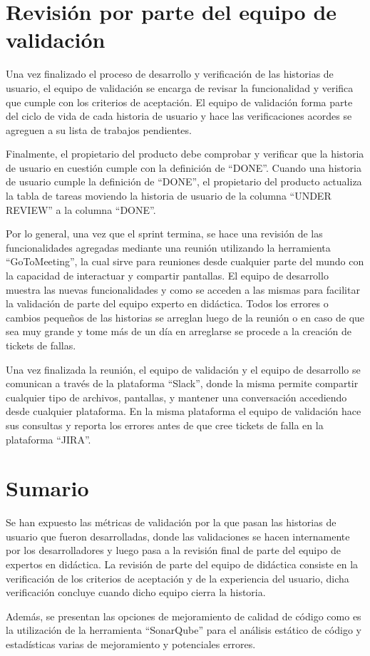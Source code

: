 \section{Revisión por parte del equipo de validación}
Una vez finalizado el proceso de desarrollo y verificación de las historias de usuario, el equipo de validación se encarga de revisar la funcionalidad y verifica que cumple con los criterios de aceptación. El equipo de validación forma parte del ciclo de vida de cada historia de usuario y hace las verificaciones acordes se agreguen a su lista de trabajos pendientes.

Finalmente, el propietario del producto debe comprobar y verificar que la historia de usuario en cuestión cumple con la definición de \enquote{DONE}. Cuando una historia de usuario cumple la definición de \enquote{DONE}, el propietario del producto actualiza la tabla de tareas moviendo la historia de usuario de la columna \enquote{UNDER REVIEW} a la columna \enquote{DONE}.

Por lo general, una vez que el sprint termina, se hace una revisión de las funcionalidades agregadas mediante una reunión utilizando la herramienta \enquote{GoToMeeting}, la cual sirve para reuniones desde cualquier parte del mundo con la capacidad de interactuar y compartir pantallas. El equipo de desarrollo muestra las nuevas funcionalidades y como se acceden a las mismas para facilitar la validación de parte del equipo experto en didáctica. Todos los errores o cambios pequeños de las historias se arreglan luego de la reunión o en caso de que sea muy grande y tome más de un día en arreglarse se procede a la creación de tickets de fallas.

Una vez finalizada la reunión, el equipo de validación y el equipo de desarrollo se comunican a través de la plataforma \enquote{Slack}, donde la misma permite compartir cualquier tipo de archivos, pantallas, y mantener una conversación accediendo desde cualquier plataforma. En la misma plataforma el equipo de validación hace sus consultas y reporta los errores antes de que cree tickets de falla en la plataforma \enquote{JIRA}.

\section{Sumario}
Se han expuesto las métricas de validación por la que pasan las historias de usuario que fueron desarrolladas, donde las validaciones se hacen internamente por los desarrolladores y luego pasa a la revisión final de parte del equipo de expertos en didáctica. La revisión de parte del equipo de didáctica consiste en la verificación de los criterios de aceptación y de la experiencia del usuario, dicha verificación concluye cuando dicho equipo cierra la historia.

Además, se presentan las opciones de mejoramiento de calidad de código como es la utilización de la herramienta \enquote{SonarQube} para el análisis estático de código y estadísticas varias de mejoramiento y potenciales errores.